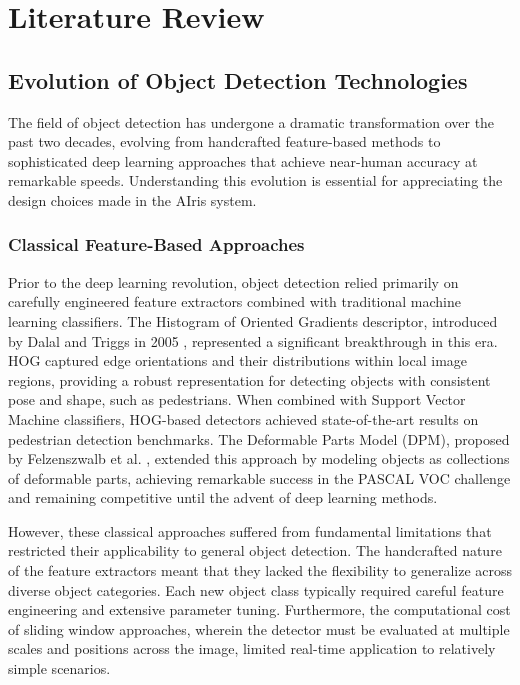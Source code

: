 \documentclass[12pt,a4paper]{report}
\begin{document}
\chapter{Literature Review}

\section{Evolution of Object Detection Technologies}

The field of object detection has undergone a dramatic transformation over the past two decades, evolving from handcrafted feature-based methods to sophisticated deep learning approaches that achieve near-human accuracy at remarkable speeds. Understanding this evolution is essential for appreciating the design choices made in the AIris system.

\subsection{Classical Feature-Based Approaches}

Prior to the deep learning revolution, object detection relied primarily on carefully engineered feature extractors combined with traditional machine learning classifiers. The Histogram of Oriented Gradients descriptor, introduced by Dalal and Triggs in 2005 \cite{hog}, represented a significant breakthrough in this era. HOG captured edge orientations and their distributions within local image regions, providing a robust representation for detecting objects with consistent pose and shape, such as pedestrians. When combined with Support Vector Machine classifiers, HOG-based detectors achieved state-of-the-art results on pedestrian detection benchmarks. The Deformable Parts Model (DPM), proposed by Felzenszwalb et al. \cite{dpm}, extended this approach by modeling objects as collections of deformable parts, achieving remarkable success in the PASCAL VOC challenge and remaining competitive until the advent of deep learning methods.

However, these classical approaches suffered from fundamental limitations that restricted their applicability to general object detection. The handcrafted nature of the feature extractors meant that they lacked the flexibility to generalize across diverse object categories. Each new object class typically required careful feature engineering and extensive parameter tuning. Furthermore, the computational cost of sliding window approaches, wherein the detector must be evaluated at multiple scales and positions across the image, limited real-time application to relatively simple scenarios.
\end{document}
